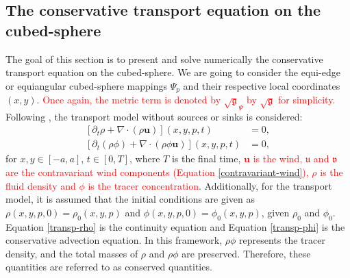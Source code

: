 \documentclass[preprint,12pt]{elsarticle}
\begin{document}
\begin{linenumbers}

\section{The conservative transport equation on the cubed-sphere}
\label{adv-2d}
The goal of this section is to present and solve numerically the conservative transport equation on the cubed-sphere. 
We are going to consider the equi-edge or equiangular cubed-sphere mappings $\Psi_p$ and their respective local coordinates $(x,y)$.
\textcolor{red}{Once again, the metric term is denoted by $\sqrt{\mathfrak{g}}_{\Psi}$ by $\sqrt{\mathfrak{g}}$ for simplicity.}
Following \cite{nair:2010}, the transport model without sources or sinks is considered:
\begin{align}
	\label{transp-rho}
	[\partial_t \rho + \nabla \cdot (\rho \boldsymbol{u})](x,y,p,t)&=0,\\
	\label{transp-phi}
	[\partial_t (\rho \phi) + \nabla \cdot (\rho \phi \boldsymbol{u})](x,y,p,t)&=0,
\end{align}
for $x,y\in[-a,a]$, $t \in [0,T]$, where $T$ is the final time,
\textcolor{red}
{$\boldsymbol{u}$ is the wind, $\mathfrak{u}$ and $\mathfrak{v}$ are the contravariant wind components (Equation \ref{contravariant-wind}),
$\rho$ is the fluid density and $\phi$ is the tracer concentration}.
Additionally, for the transport model, it is assumed that the initial conditions are given as $\rho(x,y,p,0)=\rho_0(x,y,p)$ and $\phi(x,y,p,0)=\phi_0(x,y,p)$, given $\rho_0$ and $\phi_0$. %
Equation \eqref{transp-rho} is the continuity equation and Equation \eqref{transp-phi} is the conservative advection equation.
In this framework, $\rho \phi$ represents the tracer density, and the total masses of $\rho$ and $\rho \phi$ are preserved.  Therefore, these quantities are referred to as conserved quantities.


\end{linenumbers}
\end{document}
